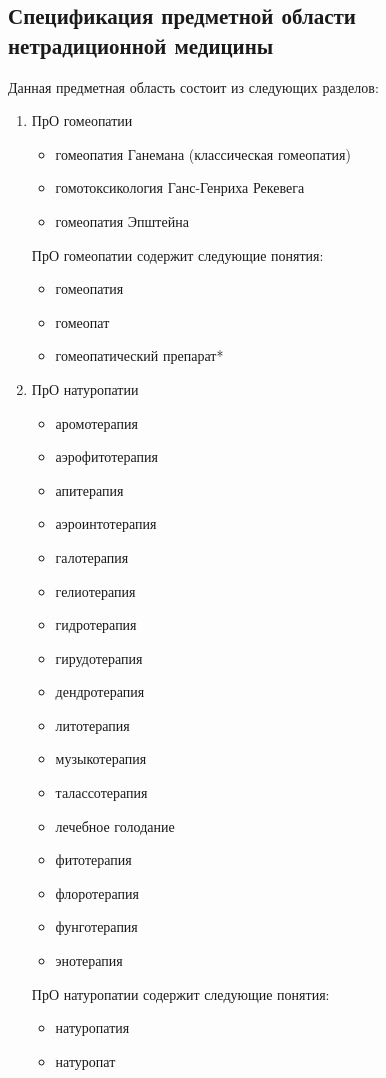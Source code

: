 \subsection{Спецификация предметной области нетрадиционной медицины}
Данная предметная область состоит из следующих разделов:
\begin{enumerate}
\item ПрО гомеопатии
\begin{itemize}
	\item гомеопатия Ганемана (классическая гомеопатия)
	\item гомотоксикология Ганс-Генриха Рекевега
	\item гомеопатия Эпштейна
\end{itemize}

ПрО гомеопатии содержит следующие понятия:
\begin{itemize}
	\item гомеопатия 
	\item гомеопат 
	\item гомеопатический препарат*\\
\end{itemize}

\item ПрО натуропатии
\begin{itemize}
	\item аромотерапия
	\item аэрофитотерапия
	\item апитерапия 
	\item аэроинтотерапия
	\item галотерапия
	\item гелиотерапия
	\item гидротерапия
	\item гирудотерапия
	\item дендротерапия
	\item литотерапия
	\item музыкотерапия 
	\item талассотерапия
	\item лечебное голодание
	\item фитотерапия
	\item флоротерапия
	\item фунготерапия
	\item энотерапия\\
\end{itemize}

ПрО натуропатии содержит следующие понятия:
\begin{itemize}
	\item натуропатия 
	\item натуропат\\
\end{itemize}


\end{enumerate}
